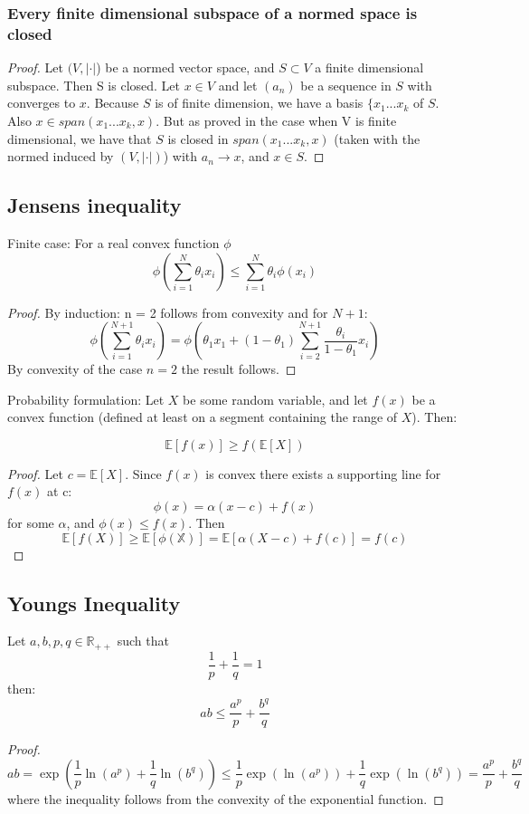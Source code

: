 \documentclass[titlepage]{article}
\begin{document}
\subsubsection{Every finite dimensional subspace of a normed space is closed}

\begin{proof}
Let $(V, |\cdot|$) be a normed vector space, and $S\subset V$ a finite dimensional subspace. Then S is closed.
Let $x\in V$ and let $(a_n)$ be a sequence in $S$ with converges to $x$. Because $S$ is of finite dimension, we have a basis $\{x_1...x_k$ of $S$. Also $x\in span(x_1...x_k,x)$. But as proved in the case when V is finite dimensional, we have that $S$ is closed in $span(x_1...x_k,x)$ (taken with the normed induced by $(V, |\cdot|)$) with $a_n \rightarrow x$, and $x\in S$.
\end{proof}








\subsection{Jensens inequality}
Finite case: For a real convex function $\phi$
$$\phi\left(\sum_{i= 1}^N \theta_ix_i\right) \leq \sum_{i=1}^N\theta_i \phi(x_i)$$
\begin{proof}
By induction: n = 2 follows from convexity and for $N+1$:
$$\phi\left(\sum_{i= 1}^{N+1} \theta_ix_i\right) =  \phi\left(\theta_1x_1 + (1-\theta_1)\sum_{i= 2}^{N+1} \frac{\theta_i}{1-\theta_1}x_i\right) $$
By convexity of the case $n= 2$ the result follows.
\end{proof}
Probability formulation:
Let $X$ be some random variable, and let $f(x)$ be a convex function (defined at least on a segment containing the range of $X$). Then:

$$\mathbb{E}[f(x)] \geq f(\mathbb{E}[X])$$
\begin{proof}
Let $c = \mathbb{E}[X]$. Since $f(x)$ is convex there exists a supporting line for $f(x)$ at c:
$$\phi(x) = \alpha(x-c) + f(x)$$
for some $\alpha$, and $\phi(x) \leq f(x)$. Then
$$ \mathbb{E}[f(X)] \geq \mathbb{E[\phi(X)]} = \mathbb{E}[\alpha(X-c) + f(c)] = f(c)$$
\end{proof}
\subsection{Youngs Inequality}
Let $a,b ,p, q \in \mathbb{R}_{++}$ such that
$$\frac{1}{p} + \frac{1}{q} = 1$$
then:
$$ab\leq \frac{a^p}{p}+ \frac{b^q}{q} $$
\begin{proof}
$$ab = \exp\left(\frac{1}{p} \ln(a^p) + \frac{1}{q}\ln(b^q)\right) \leq 
\frac{1}{p}\exp(\ln(a^p)) + \frac{1}{q}\exp(\ln(b^q)) = \frac{a^p}{p} + \frac{b^q}{q} $$
where the inequality follows from the convexity of the exponential function.
\end{proof}
\end{document}
